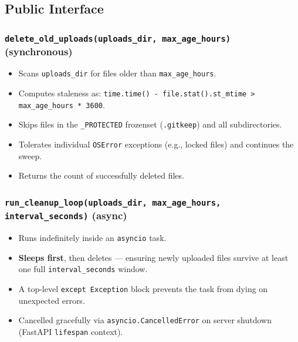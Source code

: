\documentclass[12pt, a4paper]{article}
\newcommand{\func}[1]{\texttt{\color{danger}#1}}
\begin{document}
\subsection{Public Interface}

\subsubsection{\func{delete\_old\_uploads(uploads\_dir, max\_age\_hours)} \textnormal{(synchronous)}}

\begin{itemize}[leftmargin=*, itemsep=3pt]
  \item Scans \texttt{uploads\_dir} for files older than \texttt{max\_age\_hours}.
  \item Computes staleness as: \texttt{time.time() - file.stat().st\_mtime > max\_age\_hours * 3600}.
  \item Skips files in the \texttt{\_PROTECTED} frozenset (\texttt{.gitkeep})
        and all subdirectories.
  \item Tolerates individual \texttt{OSError} exceptions (e.g., locked files)
        and continues the sweep.
  \item Returns the count of successfully deleted files.
\end{itemize}

\subsubsection{\func{run\_cleanup\_loop(uploads\_dir, max\_age\_hours, interval\_seconds)} \textnormal{(async)}}

\begin{itemize}[leftmargin=*, itemsep=3pt]
  \item Runs indefinitely inside an \texttt{asyncio} task.
  \item \textbf{Sleeps first}, then deletes — ensuring newly uploaded files
        survive at least one full \texttt{interval\_seconds} window.
  \item A top-level \texttt{except Exception} block prevents the task from
        dying on unexpected errors.
  \item Cancelled gracefully via \texttt{asyncio.CancelledError} on server
        shutdown (FastAPI \texttt{lifespan} context).
\end{itemize}
\end{document}
